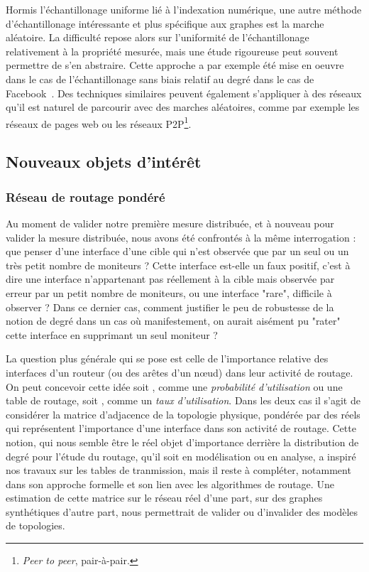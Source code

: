 Hormis l'échantillonage uniforme lié à l'indexation numérique, une autre méthode
d'échantillonage intéressante et plus spécifique aux graphes est la marche
aléatoire. La difficulté repose alors sur l'uniformité de l'échantillonage
relativement à la propriété mesurée, mais une étude rigoureuse peut souvent
permettre de s'en abstraire. Cette approche a par exemple été mise en oeuvre
dans le cas de l'échantillonage sans biais relatif au degré dans le cas de
Facebook~\cite{gjoka2010walking}. Des techniques similaires peuvent également
s'appliquer à des réseaux qu'il est naturel de parcourir avec des marches
aléatoires, comme par exemple les réseaux de pages web ou les réseaux
P2P\footnote{{\em Peer to peer}, pair-à-pair.}.

\subsection{Nouveaux objets d'intérêt}
\label{subsec:conclusion-objects}
\subsubsection{Réseau de routage pondéré}

Au moment de valider notre première mesure \traceroute distribuée, et à nouveau
pour valider la mesure \udpping distribuée, nous avons été confrontés à la même
interrogation : que penser d'une interface d'une cible qui n'est observée que
par un seul ou un très petit nombre de moniteurs ? Cette interface est-elle un
faux positif, c'est à dire une interface n'appartenant pas réellement à la cible
mais observée par erreur par un petit nombre de moniteurs, ou une interface
"rare", difficile à observer ? Dans ce dernier cas, comment justifier le peu de
robustesse de la notion de degré dans un cas où manifestement, on aurait
aisément pu "rater" cette interface en supprimant un seul moniteur ?

La question plus générale qui se pose est celle de l'importance relative des
interfaces d'un routeur (ou des arêtes d'un n\oe{}ud) dans leur activité de
routage. On peut concevoir cette idée soit \apriori, comme une {\em probabilité
d'utilisation} ou une table de routage, soit \aposteriori, comme un {\em taux
d'utilisation}. Dans les deux cas il s'agit de considérer la matrice d'adjacence
de la topologie physique, pondérée par des réels qui représentent l'importance
d'une interface dans son activité de routage. Cette notion, qui nous semble être
le réel objet d'importance derrière la distribution de degré pour l'étude du
routage, qu'il soit en modélisation ou en analyse, a inspiré nos travaux sur les
tables de tranmission, mais il reste à compléter, notamment dans son approche
formelle et son lien avec les algorithmes de routage. Une estimation de cette
matrice sur le réseau réel d'une part, sur des graphes synthétiques d'autre
part, nous permettrait de valider ou d'invalider des modèles de topologies.

